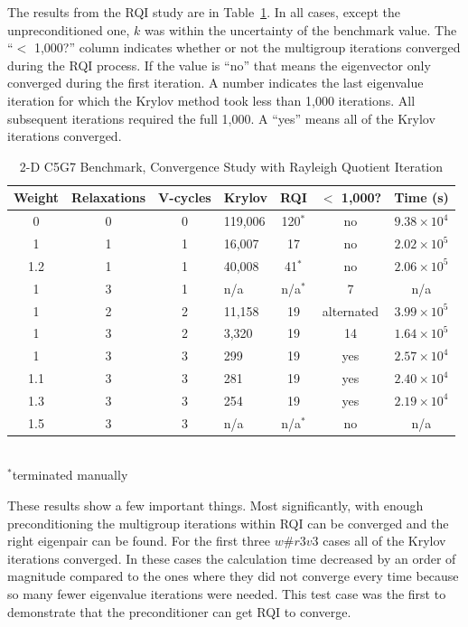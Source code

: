 The results from the RQI study are in Table~\ref{table:2-D c5g7 rqi}. In all cases, except the unpreconditioned one, $k$ was within the uncertainty of the benchmark value. The ``$<$ 1,000?'' column indicates whether or not the multigroup iterations converged during the RQI process. If the value is ``no'' that means the eigenvector only converged during the first iteration. A number indicates the last eigenvalue iteration for which the Krylov method took less than 1,000 iterations. All subsequent iterations required the full 1,000. A ``yes'' means all of the Krylov iterations converged.
%
\begin{table}[!h]
\caption{2-D C5G7 Benchmark, Convergence Study with Rayleigh Quotient Iteration}
\begin{center}
\begin{tabular}{c c c l c c c}
\hline
Weight & Relaxations & V-cycles & Krylov & RQI & $<$ 1,000? & Time (s) \\[0.5ex]
\hline
0    & 0 & 0 & 119,006 & 120$^{*}$ & no & $9.38 \times 10^{4}$ \\
1    & 1 & 1 & 16,007   & 17            & no & $2.02 \times 10^{5}$ \\
1.2 & 1 & 1 & 40,008   & 41$^{*}$   & no & $2.06 \times 10^{5}$ \\
1    & 3 & 1 & n/a         & n/a$^{*}$  & 7   & n/a \\
1    & 2 & 2 & 11,158   & 19            & alternated & $3.99 \times 10^{5}$ \\
1    & 3 & 2 & 3,320     & 19            & 14 & $1.64 \times 10^{5}$ \\
\hline
1    & 3 & 3 & 299        & 19            & yes & $2.57 \times 10^{4}$ \\
1.1 & 3 & 3 & 281        & 19            & yes & $2.40 \times 10^{4}$ \\
1.3 & 3 & 3 & 254        & 19            & yes & $2.19 \times 10^{4}$ \\
1.5 & 3 & 3 & n/a         & n/a$^{*}$ & no & n/a \\
\hline 
\end{tabular} \\
$^{*}$terminated manually
\end{center}
\label{table:2-D c5g7 rqi}
\end{table}
%

These results show a few important things. Most significantly, with enough preconditioning the multigroup iterations within RQI can be converged and the right eigenpair can be found. For the first three $w\#r3v3$ cases all of the Krylov iterations converged. In these cases the calculation time decreased by an order of magnitude compared to the ones where they did not converge every time because so many fewer eigenvalue iterations were needed. This test case was the first to demonstrate that the preconditioner can get RQI to converge. 


